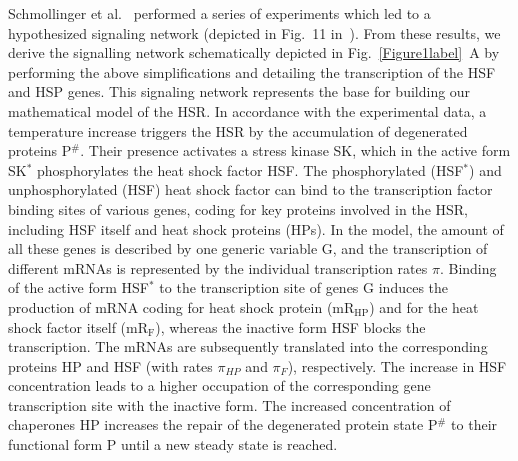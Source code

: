 \documentclass[oneside, 10pt, a4paper, twocolumn]{article}
\begin{document}
{Schmollinger et al.~\cite{Schmollinger2013} performed
  a series of experiments which led to a hypothesized signaling
  network (depicted in Fig.~11 in~\cite{Schmollinger2013}). From these
  results, we derive the signalling network schematically depicted in
  Fig.~\ref{Figure1label}~A by performing the above simplifications
  and detailing the transcription of the HSF and HSP
  genes. This signaling network represents the base for building our
  mathematical model of the HSR.}
In accordance with the experimental data, a temperature
increase triggers the HSR by the accumulation of
degenerated proteins P$^\#$. Their presence activates {a stress
kinase SK}, which in the active form SK$^*$ phosphorylates the heat
shock factor HSF. The phosphorylated (HSF$^*$) and un{phosphorylated}
(HSF) heat shock factor can bind to the transcription factor binding
sites of various genes, coding for key proteins involved in the HSR,
including HSF itself and heat shock proteins (HPs). 
In the model, the amount of all these genes is
described by one generic variable G, and the transcription of different mRNAs
is represented by the individual transcription rates $\pi$. Binding
of the active form HSF$^*$ to the transcription site of genes G induces the production of mRNA
coding for heat shock protein (mR$_{\text{HP}}$) and for the heat
shock factor itself (mR$_{\text{F}}$), whereas the inactive form HSF
blocks the transcription. The mRNAs are subsequently translated into
the corresponding proteins HP and HSF (with rates {$\pi_{HP}$ and $\pi_{F}$}),
respectively. The increase in HSF concentration leads to a higher
occupation of the corresponding gene transcription site with the inactive form. The increased
concentration of chaperones HP increases the repair of the
degenerated protein state P$^\#$ to their functional form P until a new
steady state is reached.
\end{document}
